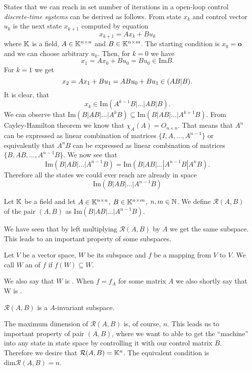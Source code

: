 States that we can reach in set number of iterations in a open-loop control \textit{discrete-time systems} can be derived as follows. From state $x_k$ and control vector $u_k$ is the next state $x_{k+1}$ computed by equation $$x_{k+1}=Ax_k+Bu_k$$ where $\mathbb{K}$ is a field, $A\in\mathbb{K}^{n\times n}$ and $B\in\mathbb{K}^{n\times m}$. The starting condition is $x_0=\textbf{o}$ and we can choose arbitrary $u_k$. Then, for $k=0$ we have $$x_1=Ax_0+Bu_0=Bu_0 \in \text{Im}B.$$ For $k=1$ we get $$x_2=Ax_1+Bu_1=ABu_0+Bu_1\in\text(AB|B).$$ It is clear, that $$x_k\in\text{Im}(A^{k-1}B|\ldots|AB|B).$$ We can observe that $\text{Im}(B|AB|\ldots|A^kB) \subseteq \text{Im}(B|AB|\ldots|A^{k+1}B)$. From Cayley-Hamilton theorem we know that $\chi_A(A)=O_{n\times n}$. That means that $A^n$ can be expressed as linear combination of matrices $\{I,A,\ldots,A^{n-1}\}$ or equivalently that $A^nB$ can be expressed as linear combination of matrices $\{B,AB,\ldots,A^{n-1}B\}$. We now see that $$\text{Im}(B|AB|\ldots|A^{n-1}B)=\text{Im}(B|AB|\ldots|A^{n-1}B|A^nB).$$ Therefore all the states we could ever reach are already in space $$\text{Im}(B|AB|\ldots|A^{n-1}B)$$

\begin{definition}
	Let $\mathbb{K}$ be a field and let $A \in \mathbb{K}^{n \times n}$, $B \in \mathbb{K}^{n \times m}$, $n,m \in \mathbb{N}$. We define  $\mathcal{R}(A,B)$ of the pair $(A,B)$ as $\text{Im}(B|AB|\ldots|A^{n-1}B)$.
\end{definition}

We have seen that by left multiplying $\mathcal{R}(A,B)$ by $A$ we get the same subspace. This leads to an important property of some subspaces.

\begin{definition}
	Let $V$ be a vector space, $W$ be its subspace and $f$ be a mapping from $V$ to $V$. We call $W$ an  of $f$ if $f(W)\subseteq W$.

	We also say that $W$ is . When $f=f_A$ for some matrix $A$ we also shortly say that W is .
\end{definition}

\begin{remark}
	\label{rem:reachinv}
	$\mathcal{R}(A,B)$ is a $A$-invariant subspace.
\end{remark} 

The maximum dimension of $\mathcal{R}(A,B)$ is, of course, $n$. This leads us to important property of pair $(A,B)$, where we want to able to get the ``machine'' into any state in state space by controlling it with our control matrix $B$. Therefore we desire that $\mathcal{R}(A,B)=\mathbb{K}^n$. The equivalent condition is $\text{dim}\mathcal{R}(A,B)=n$.

